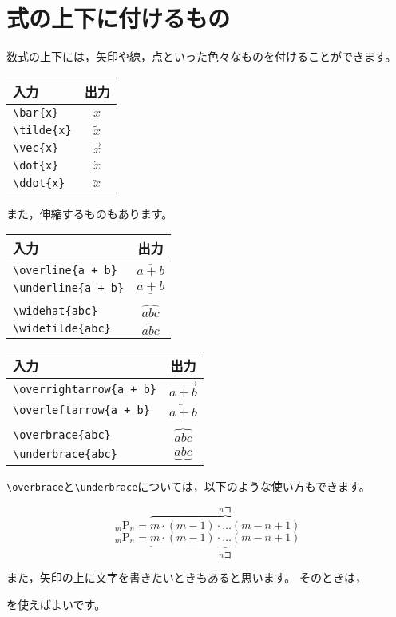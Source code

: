 \documentclass[class=jreport, crop=false, preview=false, dvipdfmx, fleqn]{standalone}
\begin{document}
\section{式の上下に付けるもの}
数式の上下には，矢印や線，点といった色々なものを付けることができます。

\begin{tabular}{lc}
入力 & 出力 \\ \hline
\verb|\bar{x}| & $\bar{x}$ \\
\verb|\tilde{x}| & $\tilde{x}$ \\
\verb|\vec{x}| & $\vec{x}$ \\
\verb|\dot{x}| & $\dot{x}$ \\
\verb|\ddot{x}| & $\ddot{x}$ \\
\end{tabular}

また，伸縮するものもあります。

\begin{tabular}{lc}
入力 & 出力 \\ \hline
\verb|\overline{a + b}| & $\overline{a + b}$ \\
\verb|\underline{a + b}| & $\underline{a + b}$ \\
\\
\verb|\widehat{abc}| & $\widehat{abc}$ \\
\verb|\widetilde{abc}| & $\widetilde{abc}$ \\
\end{tabular}
\begin{tabular}{lc}
入力 & 出力 \\ \hline
\verb|\overrightarrow{a + b}| & $\overrightarrow{a + b}$ \\
\verb|\overleftarrow{a + b}| & $\overleftarrow{a + b}$ \\
\\
\verb|\overbrace{abc}| & $\overbrace{abc}$ \\
\verb|\underbrace{abc}| & $\underbrace{abc}$ \\
\end{tabular}

\verb|\overbrace|と\verb|\underbrace|については，以下のような使い方もできます。

\begin{IOTeX*}
\[
{}_m \mathrm{P}_n =
    \overbrace{m \cdot (m-1) \cdot \dots (m-n+1)}^{n \text{コ}}
\]
\[
{}_m \mathrm{P}_n =
    \underbrace{m \cdot (m-1) \cdot \dots (m-n+1)}_{n \text{コ}}
\]
\end{IOTeX*}

また，矢印の上に文字を書きたいときもあると思います。
そのときは，
\begin{ITeX}
\end{ITeX}
を使えばよいです。
\end{document}
